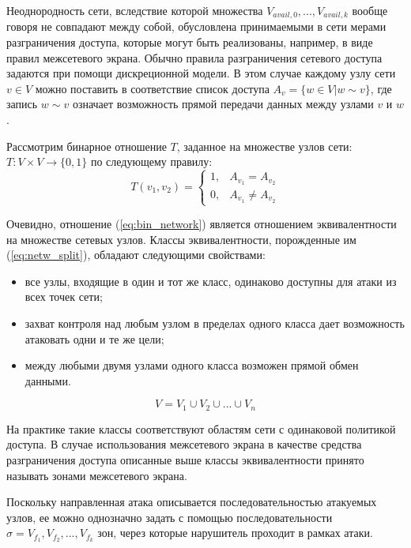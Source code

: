 Неоднородность сети, вследствие которой множества $V_{avail,0}, ... , V_{avail,k}$ вообще говоря не совпадают между собой, обусловлена принимаемыми в сети мерами разграничения доступа, которые могут быть реализованы, например, в виде правил межсетевого экрана. Обычно правила разграничения сетевого доступа задаются при помощи дискреционной модели. В этом случае каждому узлу сети $v \in V$ можно поставить в соответствие список доступа $A_v = \{ w \in V | w \sim v \}$, где запись $w \sim v$ означает возможность прямой передачи данных между узлами $v$ и $w$.
 
Рассмотрим бинарное отношение $T$, заданное на множестве узлов сети: $T: V \times V \rightarrow \{0, 1\}$ по следующему правилу:
\begin{equation}
\label{eq:bin_network}
T(v_1, v_2) = 
	\begin{cases} 
		1,  & A_{v_1} = A_{v_2} \\
		0,  & A_{v_1} \neq A_{v_2} 
	\end{cases}
\end{equation}

Очевидно, отношение (\ref{eq:bin_network}) является отношением эквивалентности на множестве сетевых узлов. Классы эквивалентности, порожденные им (\ref{eq:netw_split}), обладают следующими свойствами: 

\begin{itemize}
	\item все узлы, входящие в один и тот же класс, одинаково доступны для атаки из всех точек сети;
	\item захват контроля над любым узлом в пределах одного класса дает возможность атаковать одни и те же цели;
	\item между любыми двумя узлами одного класса возможен прямой обмен данными.
\end{itemize}
\begin{equation}
\label{eq:netw_split}
V = V_1 \cup V_2 \cup ... \cup V_n
\end{equation}

На практике такие классы соответствуют областям сети с одинаковой политикой доступа. В случае использования межсетевого экрана в качестве средства разграничения доступа описанные выше классы эквивалентности принято называть зонами межсетевого экрана.

Поскольку направленная атака описывается последовательностью атакуемых узлов, ее можно однозначно задать с помощью последовательности $\sigma = V_{f_1}, V_{f_2}, ... , V_{f_k}$ зон, через которые нарушитель проходит в рамках атаки.

